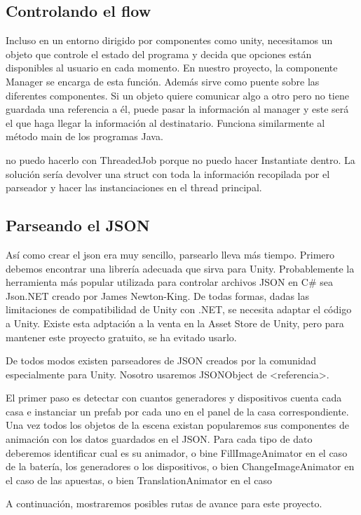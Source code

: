 \documentclass[12pt,a4paper,openright,oneside]{article}
\numberwithin{equation}{section}
\theoremstyle{definition}
\begin{document}
\subsection{Controlando el flow}
Incluso en un entorno dirigido por componentes como unity, necesitamos un objeto que controle el estado del programa y decida que opciones están disponibles al usuario en cada momento. En nuestro proyecto, la componente Manager se encarga de esta función. Además sirve como puente sobre las diferentes componentes. Si un objeto quiere comunicar algo a otro pero no tiene guardada una referencia a él, puede pasar la información al manager y este será el que haga llegar la información al destinatario. Funciona similarmente al método main de los programas Java.

no puedo hacerlo con ThreadedJob porque no puedo hacer Instantiate dentro. La solución sería devolver una struct con toda la información recopilada por el parseador y hacer las instanciaciones en el thread principal. \subsection{Parseando el JSON}

Así como crear el json era muy sencillo, parsearlo lleva más tiempo. Primero debemos encontrar una librería adecuada que sirva para Unity. Probablemente la herramienta más popular utilizada para controlar archivos JSON en C\# sea Json.NET creado por James Newton-King. De todas formas, dadas las limitaciones de compatibilidad de Unity con .NET, se necesita adaptar el código a Unity. Existe esta adptación a la venta en la Asset Store de Unity, pero para mantener este proyecto gratuito, se ha evitado usarlo. 

De todos modos existen parseadores de JSON creados por la comunidad especialmente para Unity. Nosotro usaremos JSONObject de <referencia>.

El primer paso es detectar con cuantos generadores y dispositivos cuenta cada casa e instanciar un prefab por cada uno en el panel de la casa correspondiente. Una vez todos los objetos de la escena existan popularemos sus componentes de animación con los datos guardados en el JSON. Para cada tipo de dato deberemos identificar cual es su animador, o bine FillImageAnimator en el caso de la batería, los generadores o los dispositivos, o bien ChangeImageAnimator en el caso de las apuestas, o bien TranslationAnimator en el caso 

A continuación, mostraremos posibles rutas de avance para este proyecto.
\end{document}

